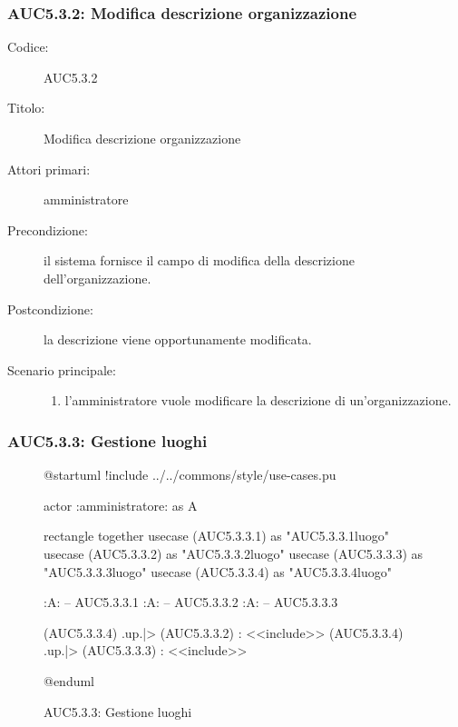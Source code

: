 \documentclass[../../../analisi-dei-requisiti.tex]{subfiles}
\begin{document}
\subsubsection{AUC5.3.2: Modifica descrizione organizzazione}%
\label{subs:AUC5.3.2}
\begin{description}
  \item[Codice:] AUC5.3.2
  \item[Titolo:] Modifica descrizione organizzazione
  \item[Attori primari:] amministratore
  \item[Precondizione:] il sistema fornisce il campo di modifica della descrizione dell'organizzazione.
  \item[Postcondizione:] la descrizione viene opportunamente modificata.
  \item[Scenario principale:]
  \begin{enumerate}
    \item l'amministratore vuole modificare la descrizione di un'organizzazione.
  \end{enumerate}
\end{description}

\subsubsection{AUC5.3.3: Gestione luoghi}%
\label{subs:AUC5.3.3}

\begin{figure}[H]
  \centering
  \begin{plantuml}
  @startuml
  !include ../../commons/style/use-cases.pu

  actor :amministratore: as A

  rectangle {
    together {
      usecase (AUC5.3.3.1) as "AUC5.3.3.1\nAggiungi luogo"
      usecase (AUC5.3.3.2) as "AUC5.3.3.2\nEliminazione luogo"
      usecase (AUC5.3.3.3) as "AUC5.3.3.3\nModifica luogo"
    }
    usecase (AUC5.3.3.4) as "AUC5.3.3.4\nSeleziona luogo"
  }

  :A: -- AUC5.3.3.1
  :A: -- AUC5.3.3.2
  :A: -- AUC5.3.3.3

  (AUC5.3.3.4) .up.|> (AUC5.3.3.2) : <<include>>
  (AUC5.3.3.4) .up.|> (AUC5.3.3.3) : <<include>>

  @enduml
  \end{plantuml}
  \caption{AUC5.3.3: Gestione luoghi}
  \label{fig:AUC5_3_3}
\end{figure}
\end{document}

